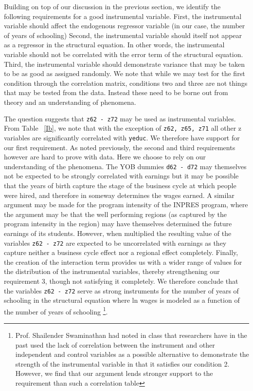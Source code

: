 \documentclass[12pt]{article}
\begin{document}


Building on top of our discussion in the previous section, we identify the following requirements for a good instrumental variable.
First, the instrumental variable should affect the endogenous regressor variable (in our case, the number of years of schooling)
Second, the instrumental variable should itself not appear as a regressor in the structural equation. In other words, the instrumental variable should not be correlated with the error term of the structural equation.
Third, the instrumental variable should demonstrate variance that may be taken to be as good as assigned randomly.
We note that while we may test for the first condition through the correlation matrix, conditions two and three are not things that may be tested from the data. Instead these need to be borne out from theory and an understanding of phenomena.
\par
The question suggests that \verb|z62 - z72| may be used as instrumental variables. From Table ~\ref{Ib}, we note that with the exception of \verb|z62, z65, z71| all other z variables are significantly correlated with \verb|yeduc|. We therefore have support for our first requirement. As noted previously, the second and third requirements however are hard to prove with data. Here we choose to rely on our understanding of the phenomena. The YOB dummies \verb|d62 - d72| may themselves not be expected to be strongly correlated with earnings but it may be possible that the years of birth capture the stage of the business cycle at which people were hired, and therefore in someway determines the wages earned. A similar argument may be made for the program intensity of the INPRES program, where the argument may be that the well performing regions (as captured by the program intensity in the region) may have themselves determined the future earnings of its students. However, when multiplied the resulting value of the variables \verb|z62 - z72| are expected to be uncorrelated with earnings as they capture neither a business cycle effect nor a regional effect completely. Finally, the creation of the interaction term provides us with a wider range of values for the distribution of the instrumental variables, thereby strengthening our requirement 3, though not satisfying it completely. We therefore conclude that the variables \verb|z62 - z72| serve as strong instruments for the number of years of schooling in the structural equation where ln wages is modeled as a function of the number of years of schooling \footnote{Prof. Shailender Swaminathan had noted in class that researchers have in the past used the lack of correlation between the instrument and other independent and control variables as a possible alternative to demonstrate the strength of the instrumental variable in that it satisfies our condition 2. However, we find that our argument lends stronger support to the requirement than such a correlation table}.
\end{document}
